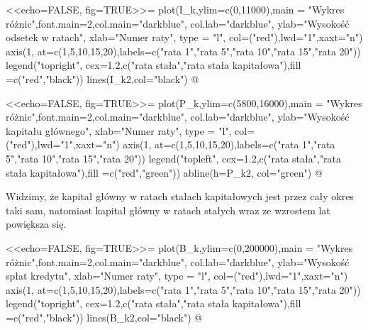 \documentclass{article}
\begin{document}
<<echo=FALSE, fig=TRUE>>=
plot(I_k,ylim=c(0,11000),main = "Wykres różnic",font.main=2,col.main="darkblue", col.lab="darkblue", ylab="Wysokość odsetek w ratach", xlab="Numer raty", type = "l", col=("red"),lwd="1",xaxt="n")
axis(1, at=c(1,5,10,15,20),labels=c("rata 1","rata 5","rata 10","rata 15","rata 20"))
legend("topright", cex=1.2,c("rata stała","rata stała kapitałowa"),fill =c("red","black"))
lines(I_k2,col="black")
@
\bigskip


\noindent{\large\textbf{}}








\bigskip

\begin{center}

<<echo=FALSE, fig=TRUE>>= 
plot(P_k,ylim=c(5800,16000),main = "Wykres różnic",font.main=2,col.main="darkblue", col.lab="darkblue", ylab="Wysokość kapitału głównego", xlab="Numer raty", type = "l", col=("red"),lwd="1",xaxt="n")
axis(1, at=c(1,5,10,15,20),labels=c("rata 1","rata 5","rata 10","rata 15","rata 20"))
legend("topleft", cex=1.2,c("rata stała","rata stała kapitałowa"),fill =c("red","green"))
abline(h=P_k2, col="green")
@
\bigskip
 
 Widzimy, że kapitał główny w ratach stałach kapitałowych jest przez cały okres taki sam, natomiast kapitał główny w ratach stałych wraz ze wzrostem lat powiększa się. 


\noindent{\large\textbf{}}
\bigskip


\noindent{\large\textbf{}}


\bigskip

\noindent{\large\textbf{}}


\bigskip
\noindent{\large\textbf{}}


\bigskip

\noindent{\large\textbf{}}


\bigskip


\noindent{\large\textbf{}}


\bigskip

<<echo=FALSE, fig=TRUE>>=
plot(B_k,ylim=c(0,200000),main = "Wykres różnic",font.main=2,col.main="darkblue", col.lab="darkblue", ylab="Wysokość spłat kredytu", xlab="Numer raty", type = "l", col=("red"),lwd="1",xaxt="n")
axis(1, at=c(1,5,10,15,20),labels=c("rata 1","rata 5","rata 10","rata 15","rata 20"))
legend("topright", cex=1.2,c("rata stała","rata stała kapitałowa"),fill =c("red","black"))
lines(B_k2,col="black")
@


\end{center}
\end{document}
